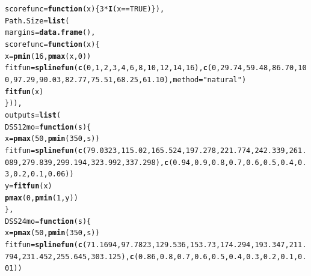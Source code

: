 \documentclass{article}\usepackage[]{graphicx}\usepackage[]{color}
\makeatletter
\newcommand{\hlnum}[1]{\textcolor[rgb]{0.686,0.059,0.569}{#1}}%
\newcommand{\hlstr}[1]{\textcolor[rgb]{0.192,0.494,0.8}{#1}}%
\newcommand{\hlopt}[1]{\textcolor[rgb]{0,0,0}{#1}}%
\newcommand{\hlstd}[1]{\textcolor[rgb]{0.345,0.345,0.345}{#1}}%
\newcommand{\hlkwa}[1]{\textcolor[rgb]{0.161,0.373,0.58}{\textbf{#1}}}%
\newcommand{\hlkwb}[1]{\textcolor[rgb]{0.69,0.353,0.396}{#1}}%
\newcommand{\hlkwc}[1]{\textcolor[rgb]{0.333,0.667,0.333}{#1}}%
\newcommand{\hlkwd}[1]{\textcolor[rgb]{0.737,0.353,0.396}{\textbf{#1}}}%
\newenvironment{kframe}{%
 \def\at@end@of@kframe{}%
 \ifinner\ifhmode%
  \def\at@end@of@kframe{\end{minipage}}%
  \begin{minipage}{\columnwidth}%
 \fi\fi%
 \def\FrameCommand##1{\hskip\@totalleftmargin \hskip-\fboxsep
 \colorbox{shadecolor}{##1}\hskip-\fboxsep
     \hskip-\linewidth \hskip-\@totalleftmargin \hskip\columnwidth}%
 \MakeFramed {\advance\hsize-\width
   \@totalleftmargin\z@ \linewidth\hsize
   \@setminipage}}%
 {\par\unskip\endMakeFramed%
 \at@end@of@kframe}
\newenvironment{knitrout}{}{} %
\makeatother
\begin{document}
\begin{knitrout}
\begin{kframe}
\begin{alltt}
                \hlkwc{scorefunc} \hlstd{=} \hlkwa{function}\hlstd{(}\hlkwc{x}\hlstd{) \{} \hlnum{3}\hlopt{*}\hlkwd{I}\hlstd{(x} \hlopt{==} \hlnum{TRUE}\hlstd{) \}),}
        \hlkwc{Path.Size} \hlstd{=} \hlkwd{list}\hlstd{(}
                \hlkwc{margins} \hlstd{=} \hlkwd{data.frame}\hlstd{(),}
                \hlkwc{scorefunc} \hlstd{=} \hlkwa{function}\hlstd{(}\hlkwc{x}\hlstd{) \{}
                        \hlstd{x} \hlkwb{=} \hlkwd{pmin}\hlstd{(}\hlnum{16}\hlstd{,} \hlkwd{pmax}\hlstd{(x,} \hlnum{0}\hlstd{))}
                        \hlstd{fitfun} \hlkwb{=} \hlkwd{splinefun}\hlstd{(}\hlkwd{c}\hlstd{(}\hlnum{0}\hlstd{,} \hlnum{1}\hlstd{,} \hlnum{2}\hlstd{,} \hlnum{3}\hlstd{,} \hlnum{4}\hlstd{,} \hlnum{6}\hlstd{,} \hlnum{8}\hlstd{,} \hlnum{10}\hlstd{,} \hlnum{12}\hlstd{,} \hlnum{14}\hlstd{,} \hlnum{16}\hlstd{),} \hlkwd{c}\hlstd{(}\hlnum{0}\hlstd{,} \hlnum{29.74}\hlstd{,} \hlnum{59.48}\hlstd{,} \hlnum{86.70}\hlstd{,} \hlnum{100}\hlstd{,} \hlnum{97.29}\hlstd{,} \hlnum{90.03}\hlstd{,} \hlnum{82.77}\hlstd{,} \hlnum{75.51}\hlstd{,} \hlnum{68.25}\hlstd{,} \hlnum{61.10}\hlstd{),} \hlkwc{method} \hlstd{=} \hlstr{"natural"}\hlstd{)}
                        \hlkwd{fitfun}\hlstd{(x)}
                \hlstd{\}) ),}
        \hlkwc{outputs} \hlstd{=} \hlkwd{list}\hlstd{(}
                \hlkwc{DSS12mo} \hlstd{=} \hlkwa{function}\hlstd{(}\hlkwc{s}\hlstd{) \{}
                        \hlstd{x} \hlkwb{=} \hlkwd{pmax}\hlstd{(}\hlnum{50}\hlstd{,} \hlkwd{pmin}\hlstd{(}\hlnum{350}\hlstd{, s))}
                        \hlstd{fitfun} \hlkwb{=} \hlkwd{splinefun}\hlstd{(}\hlkwd{c}\hlstd{(}\hlnum{79.0323}\hlstd{,} \hlnum{115.02}\hlstd{,} \hlnum{165.524}\hlstd{,} \hlnum{197.278}\hlstd{,} \hlnum{221.774}\hlstd{,} \hlnum{242.339}\hlstd{,} \hlnum{261.089}\hlstd{,} \hlnum{279.839}\hlstd{,} \hlnum{299.194}\hlstd{,} \hlnum{323.992}\hlstd{,} \hlnum{337.298}\hlstd{),} \hlkwd{c}\hlstd{(}\hlnum{0.94}\hlstd{,} \hlnum{0.9}\hlstd{,} \hlnum{0.8}\hlstd{,} \hlnum{0.7}\hlstd{,} \hlnum{0.6}\hlstd{,} \hlnum{0.5}\hlstd{,} \hlnum{0.4}\hlstd{,} \hlnum{0.3}\hlstd{,} \hlnum{0.2}\hlstd{,} \hlnum{0.1}\hlstd{,} \hlnum{0.06}\hlstd{))}
                        \hlstd{y} \hlkwb{=} \hlkwd{fitfun}\hlstd{(x)}
                        \hlkwd{pmax}\hlstd{(}\hlnum{0}\hlstd{,} \hlkwd{pmin}\hlstd{(}\hlnum{1}\hlstd{, y))}
                \hlstd{\},}
                \hlkwc{DSS24mo} \hlstd{=} \hlkwa{function}\hlstd{(}\hlkwc{s}\hlstd{) \{}
                        \hlstd{x} \hlkwb{=} \hlkwd{pmax}\hlstd{(}\hlnum{50}\hlstd{,} \hlkwd{pmin}\hlstd{(}\hlnum{350}\hlstd{, s))}
                        \hlstd{fitfun} \hlkwb{=} \hlkwd{splinefun}\hlstd{(}\hlkwd{c}\hlstd{(}\hlnum{71.1694}\hlstd{,} \hlnum{97.7823}\hlstd{,} \hlnum{129.536}\hlstd{,} \hlnum{153.73}\hlstd{,} \hlnum{174.294}\hlstd{,} \hlnum{193.347}\hlstd{,} \hlnum{211.794}\hlstd{,} \hlnum{231.452}\hlstd{,} \hlnum{255.645}\hlstd{,} \hlnum{303.125}\hlstd{),} \hlkwd{c}\hlstd{(}\hlnum{0.86}\hlstd{,} \hlnum{0.8}\hlstd{,} \hlnum{0.7}\hlstd{,} \hlnum{0.6}\hlstd{,} \hlnum{0.5}\hlstd{,} \hlnum{0.4}\hlstd{,} \hlnum{0.3}\hlstd{,} \hlnum{0.2}\hlstd{,} \hlnum{0.1}\hlstd{,} \hlnum{0.01}\hlstd{))}

\end{alltt}
\end{kframe}
\end{knitrout}
\end{document}
